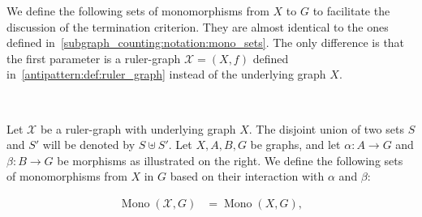 We define the following sets of monomorphisms from $X$ to $G$ to facilitate the discussion of the termination criterion. They are almost identical to the ones defined in~\autoref{subgraph_counting:notation:mono_sets}. The only difference is that the first parameter is a ruler-graph $\mathcal{X}=(X,f)$ defined in~\autoref{antipattern:def:ruler_graph} instead of the underlying graph $X$.
\begin{notation}
    \label{antipattern:notation:mono_sets}
     \ \newline
\noindent
\begin{minipage}{0.69\textwidth}
\vspace{2mm}
\noindent 
  Let \( \mathcal{X}\) be a ruler-graph with underlying graph $X$. The disjoint union of two sets \( S \) and \( S' \) will be denoted by \( S \uplus S' \). Let \( X, A, B, G \) be graphs, and let \( \alpha \colon A \to G \) and \( \beta \colon B \to G \) be morphisms as illustrated on the right. We define the following sets of monomorphisms from $X$ in $G$ based on their interaction with $\alpha$ and $\beta$:    
\end{minipage}%
\begin{minipage}{0.30\textwidth}
    \hfill
\end{minipage} 
    \begin{align*}
        \operatorname{Mono}(\mathcal{X},G) &= \operatorname{Mono}(X,G), 
        \\

\end{align*}
\end{notation}
